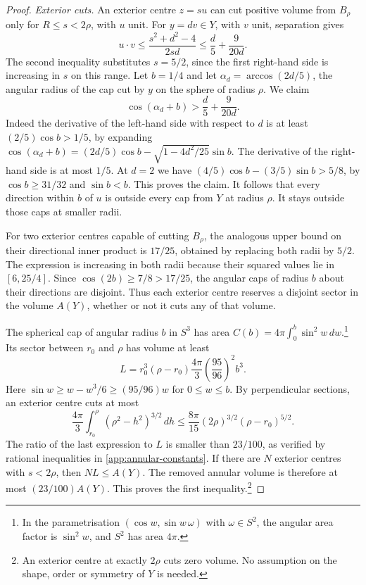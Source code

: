 \begin{proof}
\emph{Exterior cuts.}
An exterior centre \(z=su\) can cut positive volume from \(B_\rho\)
only for \(R\le s<2\rho\), with \(u\) unit. For \(y=dv\in Y\), with
\(v\) unit, separation gives
\[
 u\cdot v\le \frac{s^2+d^2-4}{2sd}\le \frac d5+\frac{9}{20d}.
\]
The second inequality substitutes \(s=5/2\), since the first
right-hand side is increasing in \(s\) on this range. Let \(b=1/4\)
and let \(\alpha_d=\arccos(2d/5)\), the angular radius of the cap
cut by \(y\) on the sphere of radius \(\rho\). We claim
\[
 \cos(\alpha_d+b) > \frac d5+\frac{9}{20d}.
\]
Indeed the derivative of the left-hand side with respect to \(d\)
is at least \((2/5)\cos b>1/5\), by expanding
\(\cos(\alpha_d+b)=(2d/5)\cos b-\sqrt{1-4d^2/25}\sin b\).
The derivative of the right-hand side is at most \(1/5\).
At \(d=2\) we have
\((4/5)\cos b-(3/5)\sin b>5/8\), by
\(\cos b\ge 31/32\) and \(\sin b<b\). This proves the claim.
It follows that every direction within \(b\) of \(u\) is outside
every cap from \(Y\) at radius \(\rho\). It stays outside those caps
at smaller radii.

For two exterior centres capable of cutting \(B_\rho\),
the analogous upper bound on their directional inner product is
\(17/25\), obtained by replacing both radii by \(5/2\).
The expression is increasing in both radii because their squared
values lie in \([6,25/4]\). Since \(\cos(2b)\ge7/8>17/25\),
the angular caps of radius \(b\) about their directions are disjoint.
Thus each exterior centre reserves a disjoint sector in the volume
\(A(Y)\), whether or not it cuts any of that volume.

The spherical cap of angular radius \(b\) in \(S^3\) has area
\(C(b)=4\pi\int_0^b\sin^2 w\,dw\).\footnote{In the parametrisation
\((\cos w,\sin w\,\omega)\) with \(\omega\in S^2\), the angular
area factor is \(\sin^2 w\), and \(S^2\) has area \(4\pi\).}
Its sector between \(r_0\) and
\(\rho\) has volume at least
\[
 L=r_0^3(\rho-r_0)\frac{4\pi}{3}\left(\frac{95}{96}\right)^2 b^3 .
\]
Here \(\sin w\ge w-w^3/6\ge(95/96)w\) for \(0\le w\le b\).
By perpendicular sections, an exterior centre cuts at most
\[
 \frac{4\pi}{3}\int_{r_0}^{\rho}(\rho^2-h^2)^{3/2}\,dh
 \le \frac{8\pi}{15}(2\rho)^{3/2}(\rho-r_0)^{5/2}.
\]
The ratio of the last expression to \(L\) is smaller than
\(23/100\), as verified by rational inequalities in
\cref{app:annular-constants}. If there are \(N\) exterior centres
with \(s<2\rho\), then \(NL\le A(Y)\). The removed annular volume
is therefore at most \((23/100)A(Y)\). This proves the first
inequality.\footnote{An exterior centre at exactly \(2\rho\) cuts
zero volume. No assumption on the shape, order or symmetry of \(Y\)
is needed.}


\end{proof}
